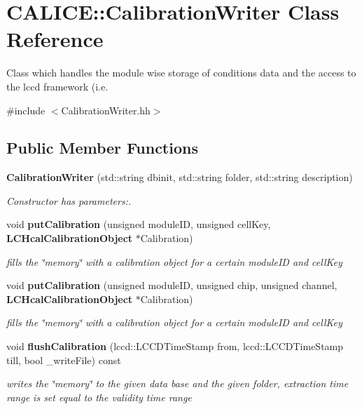 \section{CALICE::CalibrationWriter Class Reference}
\label{classCALICE_1_1CalibrationWriter}


Class which handles the module wise storage of conditions data and the access to the lccd framework (i.e.  


{\ttfamily \#include $<$CalibrationWriter.hh$>$}\subsection*{Public Member Functions}
\begin{DoxyCompactItemize}
\item 
{\bf CalibrationWriter} (std::string dbinit, std::string folder, std::string description)
\begin{DoxyCompactList}\small\item\em Constructor has parameters:. \item\end{DoxyCompactList}\item 
void {\bf putCalibration} (unsigned moduleID, unsigned cellKey, {\bf LCHcalCalibrationObject} $\ast$Calibration)
\begin{DoxyCompactList}\small\item\em fills the \char`\"{}memory\char`\"{} with a calibration object for a certain moduleID and cellKey \item\end{DoxyCompactList}\item 
void {\bf putCalibration} (unsigned moduleID, unsigned chip, unsigned channel, {\bf LCHcalCalibrationObject} $\ast$Calibration)
\begin{DoxyCompactList}\small\item\em fills the \char`\"{}memory\char`\"{} with a calibration object for a certain moduleID and cellKey \item\end{DoxyCompactList}\item 
void {\bf flushCalibration} (lccd::LCCDTimeStamp from, lccd::LCCDTimeStamp till, bool \_\-writeFile) const 
\begin{DoxyCompactList}\small\item\em writes the \char`\"{}memory\char`\"{} to the given data base and the given folder, extraction time range is set equal to the validity time range \item\end{DoxyCompactList}\item 

\end{DoxyCompactItemize}
